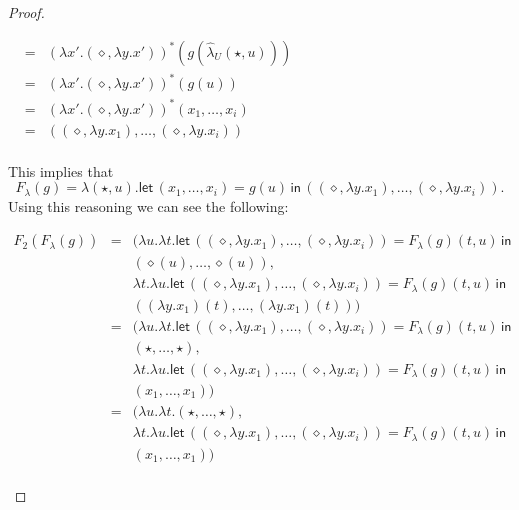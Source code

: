 \begin{proof}
\begin{report}
\begin{center}
\begin{itemize}
\begin{center}
\begin{math}
\begin{array}{lll}
            & = & (\lambda x'.(\diamond,\lambda y.x'))^*(g(\hat{\lambda}_U(\star,u)))\\
            & = & (\lambda x'.(\diamond,\lambda y.x'))^*(g(u))\\
            & = & (\lambda x'.(\diamond,\lambda y.x'))^*(x_1,\ldots,x_i)\\
            & = & ((\diamond,\lambda y.x_1),\ldots,(\diamond,\lambda y.x_i))\\
          \end{array}
        \end{math}
      \end{center}
      This implies that 
      \[ F_\lambda(g) = \lambda (\star,u).\mathsf{let}\,(x_1,\ldots,x_i) = g(u)\,\mathsf{in}\,((\diamond,\lambda y.x_1),\ldots,(\diamond,\lambda y.x_i)).\]
      Using this reasoning we can see the following:
      \begin{center}
        \begin{math}
          \begin{array}{lll}
            F_2(F_\lambda(g))
            & = & (\lambda u.\lambda t.\mathsf{let}\,((\diamond,\lambda y.x_1),\ldots,(\diamond,\lambda y.x_i)) = F_\lambda(g)(t,u)\,\mathsf{in}\,\\
                  & & (\diamond(u),\ldots,\diamond(u)),\\            
            & & \lambda t.\lambda u.\mathsf{let}\,((\diamond,\lambda y.x_1),\ldots,(\diamond,\lambda y.x_i)) = F_\lambda(g)(t,u)
                \,\mathsf{in}\, \\
            & & ((\lambda y.x_1)(t),\ldots,(\lambda y.x_1)(t)))\\
            & = & (\lambda u.\lambda t.\mathsf{let}\,((\diamond,\lambda y.x_1),\ldots,(\diamond,\lambda y.x_i)) = F_\lambda(g)(t,u)\,\mathsf{in}\,\\
            & & (\star,\ldots,\star),\\            
            & & \lambda t.\lambda u.\mathsf{let}\,((\diamond,\lambda y.x_1),\ldots,(\diamond,\lambda y.x_i)) = F_\lambda(g)(t,u)
                \,\mathsf{in}\, \\
            & & (x_1,\ldots,x_1))\\
            & = & (\lambda u.\lambda t.(\star,\ldots,\star),\\            
            & & \lambda t.\lambda u.\mathsf{let}\,((\diamond,\lambda y.x_1),\ldots,(\diamond,\lambda y.x_i)) = F_\lambda(g)(t,u)
                \,\mathsf{in}\, \\
            & & (x_1,\ldots,x_1))\\

\end{array}
\end{math}
\end{center}
\end{itemize}
\end{center}
\end{report}
\end{proof}
